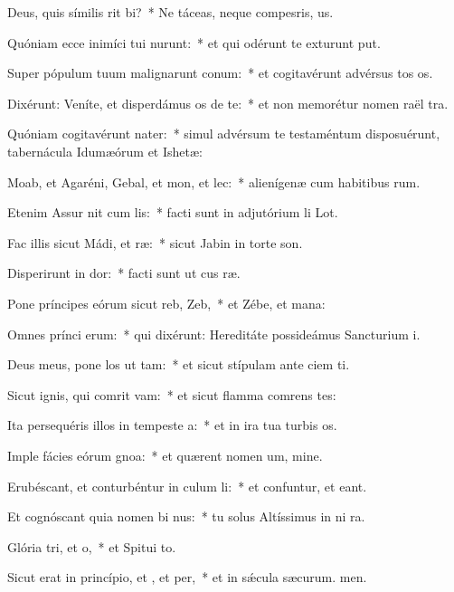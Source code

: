 \item Deus, quis símilis rit bi?~* Ne táceas, neque compesris, us.
\item Quóniam ecce inimíci tui nurunt:~* et qui odérunt te exturunt put.
\item Super pópulum tuum malignarunt conum:~* et cogitavérunt advérsus tos os.
\item Dixérunt: Veníte, et disperdámus os de te:~* et non memorétur nomen raël tra.
\item Quóniam cogitavérunt nater:~* simul advérsum te testaméntum disposuérunt, tabernácula Idumæórum et Ishetæ:
\item Moab, et Agaréni, Gebal, et mon, et lec:~* alienígenæ cum habitibus rum.
\item Etenim Assur nit cum lis:~* facti sunt in adjutórium li Lot.
\item Fac illis sicut Mádi, et ræ:~* sicut Jabin in torte son.
\item Disperirunt in dor:~* facti sunt ut cus ræ.
\item Pone príncipes eórum sicut reb,  Zeb,~* et Zébe, et mana:
\item Omnes prínci erum:~* qui dixérunt: Hereditáte possideámus Sancturium i.
\item Deus meus, pone los ut tam:~* et sicut stípulam ante ciem ti.
\item Sicut ignis, qui comrit vam:~* et sicut flamma comrens tes:
\item Ita persequéris illos in tempeste a:~* et in ira tua turbis os.
\item Imple fácies eórum gnoa:~* et quærent nomen um, mine.
\item Erubéscant, et conturbéntur in culum li:~* et confuntur, et eant.
\item Et cognóscant quia nomen bi nus:~* tu solus Altíssimus in ni ra.
\item Glória tri, et o,~* et Spitui to.
\item Sicut erat in princípio, et , et per,~* et in sǽcula sæcurum. men.
